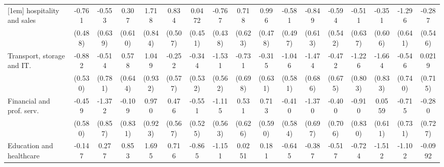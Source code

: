 {\begin{tabular}{l*{16}{c}}
[1em]
hospitality and sales&      -0.761         &      -0.553         &       0.307         &       1.718\sym{*}  &       0.834         &      0.0472         &      -0.767         &       0.718         &       0.996\sym{*}  &      -0.581         &      -0.849         &      -0.594         &      -0.511         &      -0.351         &      -1.296\sym{*}  &      -0.287         \\
                    &     (0.488)         &     (0.639)         &     (0.610)         &     (0.844)         &     (0.507)         &     (0.451)         &     (0.438)         &     (0.623)         &     (0.478)         &     (0.497)         &     (0.613)         &     (0.542)         &     (0.637)         &     (0.606)         &     (0.641)         &     (0.546)         \\
[1em]
Transport, storage and IT.&      -0.882         &      -0.514         &       0.578         &       1.049         &      -0.252         &      -0.344         &      -1.531\sym{**} &      -0.731         &      -0.315         &      -1.046         &      -1.474\sym{*}  &      -0.472         &      -1.226         &      -1.664\sym{*}  &      -0.546         &      0.0219         \\
                    &     (0.530)         &     (0.781)         &     (0.644)         &     (0.932)         &     (0.577)         &     (0.532)         &     (0.562)         &     (0.698)         &     (0.631)         &     (0.581)         &     (0.686)         &     (0.675)         &     (0.803)         &     (0.833)         &     (0.740)         &     (0.715)         \\
[1em]
Financial and prof. serv.&      -0.459         &      -1.372         &      -0.109         &       0.970         &       0.476         &      -0.551         &      -1.115\sym{*}  &       0.531         &       0.713         &      -0.410         &      -1.370\sym{*}  &      -0.400         &      -0.910         &      0.0559         &      -0.715         &      -0.280         \\
                    &     (0.580)         &     (0.857)         &     (0.831)         &     (0.923)         &     (0.567)         &     (0.525)         &     (0.563)         &     (0.626)         &     (0.590)         &     (0.584)         &     (0.697)         &     (0.706)         &     (0.830)         &     (0.611)         &     (0.731)         &     (0.727)         \\
[1em]
Education and healthcare&      -0.147         &       0.277         &       0.853         &       1.695         &       0.716         &      -0.865         &      -1.151\sym{*}  &      0.0251         &       0.181         &      -0.645         &      -0.387         &      -0.517         &      -0.724         &      -1.512\sym{*}  &      -1.102         &     -0.0992         \\

\end{tabular}}
